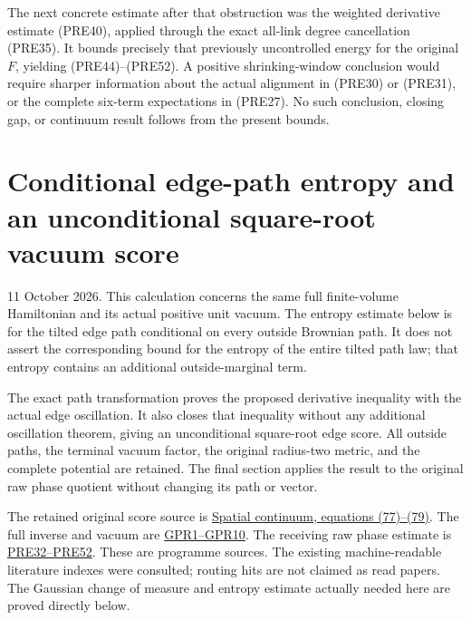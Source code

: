 \documentclass[11pt]{article}
\begin{document}
The next concrete estimate after that obstruction was the weighted derivative estimate (PRE40), applied through the exact all-link degree cancellation (PRE35). It bounds precisely that previously uncontrolled energy for the original \(F\), yielding (PRE44)–(PRE52). A positive shrinking-window conclusion would require sharper information about the actual alignment in (PRE30) or (PRE31), or the complete six-term expectations in (PRE27). No such conclusion, closing gap, or continuum result follows from the present bounds.
\clearpage
\section*{Conditional edge-path entropy and an unconditional square-root vacuum score}

11 October 2026. This calculation concerns the same full finite-volume Hamiltonian and its actual positive unit vacuum. The entropy estimate below is for the tilted edge path conditional on every outside Brownian path. It does not assert the corresponding bound for the entropy of the entire tilted path law; that entropy contains an additional outside-marginal term.

The exact path transformation proves the proposed derivative inequality with the actual edge oscillation. It also closes that inequality without any additional oscillation theorem, giving an unconditional square-root edge score. All outside paths, the terminal vacuum factor, the original radius-two metric, and the complete potential are retained. The final section applies the result to the original raw phase quotient without changing its path or vector.

The retained original score source is \href{https://github.com/KokunoYumeto/yang-mills-interacting-workbench/blob/485b61423c1f4e1805deb453c1b6b342b27842b6/yang-mills/continuations/20260930-s6-ns-moment-map-bridge/sources/spatial/spatial_continuum.tex#L1415}{Spatial continuum, equations (77)–(79)}. The full inverse and vacuum are \href{https://github.com/KokunoYumeto/yang-mills-interacting-workbench/blob/442786391ab942ad0c829c0ebf32e952585915e0/yang-mills/continuations/20261011-central-signs-shrinking-window/GLOBAL_PHYSICAL_RESPONSE.md}{GPR1–GPR10}. The receiving raw phase estimate is \href{https://github.com/KokunoYumeto/yang-mills-interacting-workbench/blob/main/yang-mills/continuations/20261011-central-signs-shrinking-window/PHASE_RESPONSE_AND_ENDPOINT.md}{PRE32–PRE52}. These are programme sources. The existing machine-readable literature indexes were consulted; routing hits are not claimed as read papers. The Gaussian change of measure and entropy estimate actually needed here are proved directly below.
\end{document}
